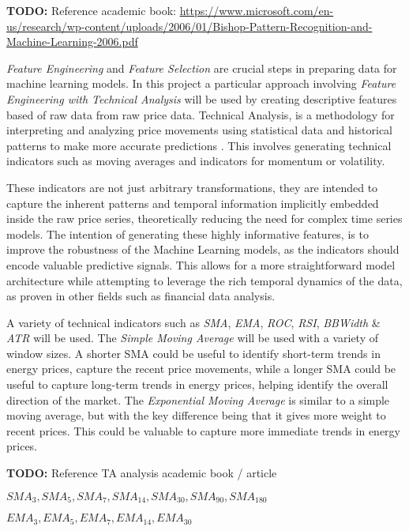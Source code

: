 \documentclass[12pt]{report} %
\begin{document}
\textbf{TODO:} Reference academic book: \url{https://www.microsoft.com/en-us/research/wp-content/uploads/2006/01/Bishop-Pattern-Recognition-and-Machine-Learning-2006.pdf}

\textit{Feature Engineering} and \textit{Feature Selection} are crucial steps in preparing data for machine learning models. In this project a particular approach involving \textit{Feature Engineering with Technical Analysis} will be used by creating descriptive features based of raw data from raw price data. Technical Analysis, is a methodology for interpreting and analyzing price movements using statistical data and historical patterns to make more accurate predictions \cite{britannica_ta}. This involves generating technical indicators such as moving averages and indicators for momentum or volatility.

These indicators are not just arbitrary transformations, they are intended to capture the inherent patterns and temporal information implicitly embedded inside the raw price series, theoretically reducing the need for complex time series models. The intention of generating these highly informative features, is to improve the robustness of the Machine Learning models, as the indicators should encode valuable predictive signals. This allows for a more straightforward model architecture while attempting to leverage the rich temporal dynamics of the data, as proven in other fields such as financial data analysis.
    
A variety of technical indicators such as \textit{SMA}, \textit{EMA}, \textit{ROC}, \textit{RSI}, \textit{BBWidth} \& \textit{ATR} will be used. The \textit{Simple Moving Average} will be used with a variety of window sizes. A shorter SMA could be useful to identify short-term trends in energy prices, capture the recent price movements, while a longer SMA could be useful to capture long-term trends in energy prices, helping identify the overall direction of the market. The \textit{Exponential Moving Average} is similar to a simple moving average, but with the key difference being that it gives more weight to recent prices. This could be valuable to capture more immediate trends in energy prices.

\textbf{TODO:} Reference TA analysis academic book / article

    $ SMA_{3}, SMA_{5}, SMA_{7}, SMA_{14}, SMA_{30}, SMA_{90}, SMA_{180} $
    
    $ EMA_{3}, EMA_{5}, EMA_{7}, EMA_{14}, EMA_{30}  $
\end{document}
